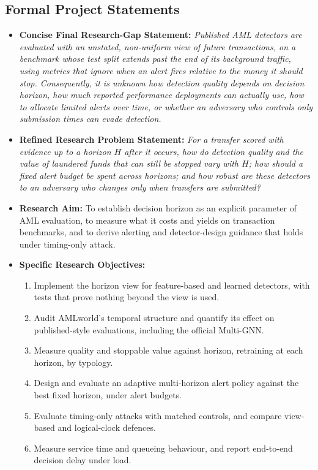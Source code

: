 \documentclass[11pt,a4paper]{article}
\begin{document}
\subsection{Formal Project Statements}
\begin{itemize}[leftmargin=*]
    \item \textbf{Concise Final Research-Gap Statement:}
    \textit{Published AML detectors are evaluated with an unstated, non-uniform view of future transactions, on a benchmark whose test split extends past the end of its background traffic, using metrics that ignore when an alert fires relative to the money it should stop. Consequently, it is unknown how detection quality depends on decision horizon, how much reported performance deployments can actually use, how to allocate limited alerts over time, or whether an adversary who controls only submission times can evade detection.}

    \item \textbf{Refined Research Problem Statement:}
    \textit{For a transfer scored with evidence up to a horizon $H$ after it occurs, how do detection quality and the value of laundered funds that can still be stopped vary with $H$; how should a fixed alert budget be spent across horizons; and how robust are these detectors to an adversary who changes only when transfers are submitted?}

    \item \textbf{Research Aim:}
    To establish decision horizon as an explicit parameter of AML evaluation, to measure what it costs and yields on transaction benchmarks, and to derive alerting and detector-design guidance that holds under timing-only attack.

    \item \textbf{Specific Research Objectives:}
    \begin{enumerate}[leftmargin=*]
        \item Implement the horizon view for feature-based and learned detectors, with tests that prove nothing beyond the view is used.
        \item Audit AMLworld's temporal structure and quantify its effect on published-style evaluations, including the official Multi-GNN.
        \item Measure quality and stoppable value against horizon, retraining at each horizon, by typology.
        \item Design and evaluate an adaptive multi-horizon alert policy against the best fixed horizon, under alert budgets.
        \item Evaluate timing-only attacks with matched controls, and compare view-based and logical-clock defences.
        \item Measure service time and queueing behaviour, and report end-to-end decision delay under load.
    \end{enumerate}


\end{itemize}
\end{document}
